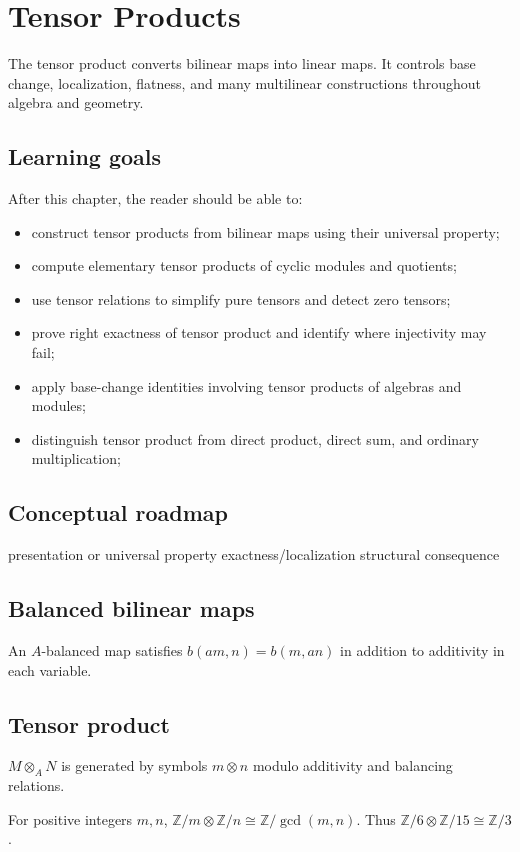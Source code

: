 \chapter{Tensor Products}
\label{ch:v10}

The tensor product converts bilinear maps into linear maps. It controls base change, localization, flatness, and many multilinear constructions throughout algebra and geometry.

\section*{Learning goals}
After this chapter, the reader should be able to:
\begin{itemize}
\item construct tensor products from bilinear maps using their universal property;
\item compute elementary tensor products of cyclic modules and quotients;
\item use tensor relations to simplify pure tensors and detect zero tensors;
\item prove right exactness of tensor product and identify where injectivity may fail;
\item apply base-change identities involving tensor products of algebras and modules;
\item distinguish tensor product from direct product, direct sum, and ordinary multiplication;
\end{itemize}
\section*{Conceptual roadmap}
\volroadmap
  {presentation or universal property}
  {exactness/localization}
  {structural consequence}

\section{Balanced bilinear maps}
An $A$-balanced map satisfies $b(am,n)=b(m,an)$ in addition to additivity in each variable.

\section{Tensor product}
$M\otimes_A N$ is generated by symbols $m\otimes n$ modulo additivity and balancing relations.

\begin{example}\label{ex:v10-expand-01}
For positive integers $m,n$, $\mathbb Z/m\otimes\mathbb Z/n\cong\mathbb Z/\gcd(m,n)$. Thus $\mathbb Z/6\otimes\mathbb Z/15\cong\mathbb Z/3$.
\end{example}
